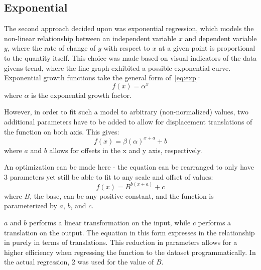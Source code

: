 \documentclass{mcmthesis}
\begin{document}
    \subsection{Exponential}
    The second approach decided upon was exponential regression, which models the non-linear relationship between an independent variable $x$ and dependent variable $y$, where the rate of change of $y$ with respect to $x$ at a given point is proportional to the quantity itself.
    This choice was made based on visual indicators of the data given\textquotesingle s trend, where the line graph exhibited a possible exponential curve.
    Exponential growth functions take the general form of~\eqref{eq:exp}:
%
    \begin{equation}
        f(x) = \alpha^x
        \label{eq:exp}
    \end{equation}
%
    \noindent where $\alpha$ is the exponential growth factor.

    However, in order to fit such a model to arbitrary (non-normalized) values, two additional parameters have to be added to allow for displacement translations of the function on both axis. This gives:
%
    \begin{equation}
        f(x) = \beta (\alpha)^{x + a} + b
        \label{eq:exp2}
    \end{equation}
%
    \noindent where $a$ and $b$ allows for offsets in the x and y axis, respectively.

    An optimization can be made here - the equation can be rearranged to only have 3 parameters yet still be able to fit to any scale and offset of values:
%
    \begin{equation}
        f(x) = B^{b (x + a)} + c
        \label{eq:exp3}
    \end{equation}
%
    \noindent where $B$, the base, can be any positive constant, and the function is parameterized by $a$, $b$, and $c$.

    $a$ and $b$ performs a linear transformation on the input, while $c$ performs a translation on the output.
    The equation in this form expresses in the relationship in purely in terms of translations.
    This reduction in parameters allows for a higher efficiency when regressing the function to the dataset programmatically.
    In the actual regression, 2 was used for the value of $B$.
\end{document}
